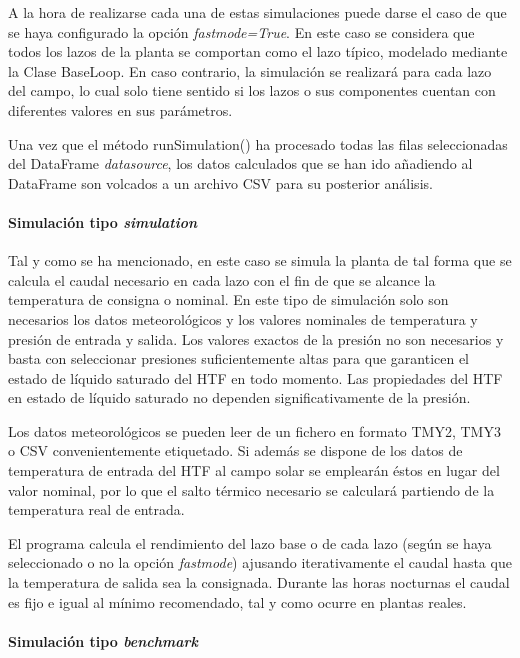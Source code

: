 \documentclass[11pt]{article}
\begin{document}
A la hora de realizarse cada una de estas simulaciones puede darse el
caso de que se haya configurado la opción \emph{fastmode=True}. En este
caso se considera que todos los lazos de la planta se comportan como el
lazo típico, modelado mediante la Clase BaseLoop. En caso contrario, la
simulación se realizará para cada lazo del campo, lo cual solo tiene
sentido si los lazos o sus componentes cuentan con diferentes valores en
sus parámetros.

Una vez que el método runSimulation() ha procesado todas las filas
seleccionadas del DataFrame \emph{datasource}, los datos calculados que
se han ido añadiendo al DataFrame son volcados a un archivo CSV para su
posterior análisis.

\hypertarget{simulaciuxf3n-tipo-simulation}{%
\paragraph{\texorpdfstring{Simulación tipo
\emph{simulation}}{Simulación tipo simulation}}\label{simulaciuxf3n-tipo-simulation}}

Tal y como se ha mencionado, en este caso se simula la planta de tal
forma que se calcula el caudal necesario en cada lazo con el fin de que
se alcance la temperatura de consigna o nominal. En este tipo de
simulación solo son necesarios los datos meteorológicos y los valores
nominales de temperatura y presión de entrada y salida. Los valores
exactos de la presión no son necesarios y basta con seleccionar
presiones suficientemente altas para que garanticen el estado de líquido
saturado del HTF en todo momento. Las propiedades del HTF en estado de
líquido saturado no dependen significativamente de la presión.

Los datos meteorológicos se pueden leer de un fichero en formato TMY2,
TMY3 o CSV convenientemente etiquetado. Si además se dispone de los
datos de temperatura de entrada del HTF al campo solar se emplearán
éstos en lugar del valor nominal, por lo que el salto térmico necesario
se calculará partiendo de la temperatura real de entrada.

El programa calcula el rendimiento del lazo base o de cada lazo (según
se haya seleccionado o no la opción \emph{fastmode}) ajusando
iterativamente el caudal hasta que la temperatura de salida sea la
consignada. Durante las horas nocturnas el caudal es fijo e igual al
mínimo recomendado, tal y como ocurre en plantas reales.

\hypertarget{simulaciuxf3n-tipo-benchmark}{%
\paragraph{\texorpdfstring{Simulación tipo
\emph{benchmark}}{Simulación tipo benchmark}}\label{simulaciuxf3n-tipo-benchmark}}
\end{document}
